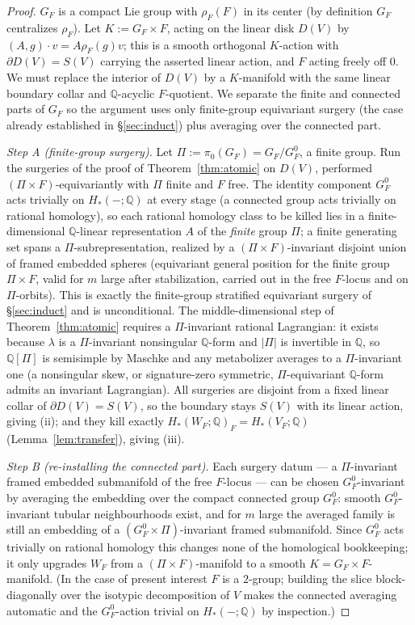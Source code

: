 \documentclass[12pt]{article}
\theoremstyle{definition}
\begin{document}
\begin{proof}
$G_F$ is a compact Lie group with $\rho_F(F)$ in its center (by definition $G_F$
centralizes $\rho_F$). Let $K:=G_F\times F$, acting on the linear disk $D(V)$ by
$(A,g)\cdot v=A\rho_F(g)v$; this is a smooth orthogonal $K$-action with
$\partial D(V)=S(V)$ carrying the asserted linear action, and $F$ acting freely
off $0$. We must replace the interior of $D(V)$ by a $K$-manifold with the same
linear boundary collar and $\mathbb{Q}$-acyclic $F$-quotient. We separate the
finite and connected parts of $G_F$ so the argument uses only finite-group
equivariant surgery (the case already established in \S\ref{sec:induct}) plus
averaging over the connected part.

\emph{Step A (finite-group surgery).} Let $\Pi:=\pi_0(G_F)=G_F/G_F^0$, a finite
group. Run the surgeries of the proof of Theorem~\ref{thm:atomic} on $D(V)$,
performed $(\Pi\times F)$-equivariantly with $\Pi$ finite and $F$ free. The
identity component $G_F^0$ acts trivially on $H_*(-;\mathbb{Q})$ at every stage
(a connected group acts trivially on rational homology), so each rational
homology class to be killed lies in a finite-dimensional $\mathbb{Q}$-linear
representation $A$ of the \emph{finite} group $\Pi$; a finite generating set spans
a $\Pi$-subrepresentation, realized by a $(\Pi\times F)$-invariant disjoint union
of framed embedded spheres (equivariant general position for the finite group
$\Pi\times F$, valid for $m$ large after stabilization, carried out in the free
$F$-locus and on $\Pi$-orbits). This is exactly the finite-group stratified
equivariant surgery of \S\ref{sec:induct} and is unconditional. The
middle-dimensional step of Theorem~\ref{thm:atomic} requires a $\Pi$-invariant
rational Lagrangian: it exists because $\lambda$ is a $\Pi$-invariant nonsingular
$\mathbb{Q}$-form and $|\Pi|$ is invertible in $\mathbb{Q}$, so $\mathbb{Q}[\Pi]$
is semisimple by Maschke and any metabolizer averages to a $\Pi$-invariant one
(a nonsingular skew, or signature-zero symmetric, $\Pi$-equivariant
$\mathbb{Q}$-form admits an invariant Lagrangian). All surgeries are disjoint from
a fixed linear collar of $\partial D(V)=S(V)$, so the boundary stays $S(V)$ with
its linear action, giving (ii); and they kill exactly
$H_*(W_F;\mathbb{Q})_F=H_*(V_F;\mathbb{Q})$ (Lemma~\ref{lem:transfer}), giving
(iii).

\emph{Step B (re-installing the connected part).} Each surgery datum --- a
$\Pi$-invariant framed embedded submanifold of the free $F$-locus --- can be
chosen $G_F^0$-invariant by averaging the embedding over the compact connected
group $G_F^0$: smooth $G_F^0$-invariant tubular neighbourhoods exist, and for $m$
large the averaged family is still an embedding of a $(G_F^0\times\Pi)$-invariant
framed submanifold. Since $G_F^0$ acts trivially on rational homology this
changes none of the homological bookkeeping; it only upgrades $W_F$ from a
$(\Pi\times F)$-manifold to a smooth $K=G_F\times F$-manifold. (In the case of
present interest $F$ is a $2$-group; building the slice block-diagonally over the
isotypic decomposition of $V$ makes the connected averaging automatic and the
$G_F^0$-action trivial on $H_*(-;\mathbb{Q})$ by inspection.)


\end{proof}
\end{document}
